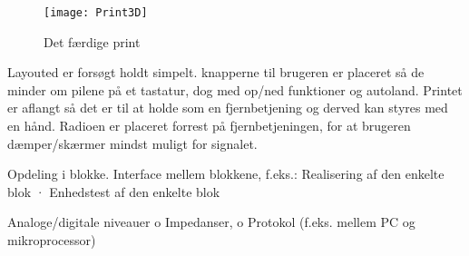 \documentclass[Main]{subfiles}
\begin{document}
\begin{figure}[H]
\centering
\texttt{[image: Print3D]}
\caption{Det færdige print}
\label{fig: Print3D}
\end{figure}

Layouted er forsøgt holdt simpelt. knapperne til brugeren er placeret så de minder om pilene på et tastatur, dog med op/ned funktioner og autoland.
Printet er aflangt så det er til at holde som en fjernbetjening og derved kan styres med en hånd.
Radioen er placeret forrest på fjernbetjeningen, for at brugeren dæmper/skærmer mindst muligt for signalet.  

Opdeling i blokke.
Interface mellem blokkene, f.eks.:
Realisering af den enkelte blok
· Enhedstest af den enkelte blok

Analoge/digitale niveauer
o Impedanser,
o Protokol (f.eks. mellem PC og mikroprocessor)
\end{document}
